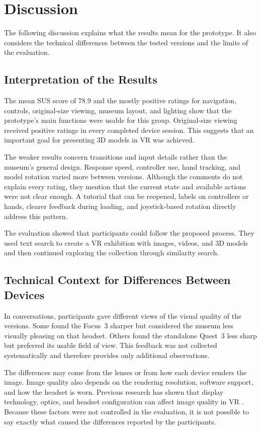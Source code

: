 \section{Discussion}

The following discussion explains what the results mean for the prototype. It also considers the technical differences between the tested versions and the limits of the evaluation.

\subsection{Interpretation of the Results}

The mean SUS score of 78.9 and the mostly positive ratings for navigation, controls, original-size viewing, museum layout, and lighting show that the prototype's main functions were usable for this group. Original-size viewing received positive ratings in every completed device session. This suggests that an important goal for presenting 3D models in VR was achieved.

\clearpage
The weaker results concern transitions and input details rather than the museum's general design. Response speed, controller use, hand tracking, and model rotation varied more between versions. Although the comments do not explain every rating, they mention that the current state and available actions were not clear enough. A tutorial that can be reopened, labels on controllers or hands, clearer feedback during loading, and joystick-based rotation directly address this pattern.

The evaluation showed that participants could follow the proposed process. They used text search to create a VR exhibition with images, videos, and 3D models and then continued exploring the collection through similarity search.

\subsection{Technical Context for Differences Between Devices}

In conversations, participants gave different views of the visual quality of the versions. Some found the Focus~3 sharper but considered the museum less visually pleasing on that headset. Others found the standalone Quest~3 less sharp but preferred its usable field of view. This feedback was not collected systematically and therefore provides only additional observations.

The differences may come from the lenses or from how each device renders the image. Image quality also depends on the rendering resolution, software support, and how the headset is worn. Previous research has shown that display technology, optics, and headset configuration can affect image quality in VR \citep{koulieris2019neareye,bhansali2024contrast}. Because these factors were not controlled in the evaluation, it is not possible to say exactly what caused the differences reported by the participants.

